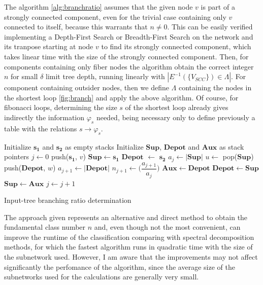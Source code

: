 \documentclass[12pt]{diazessay} %
\begin{document}
The algorithm \ref{alg:branchratio} assumes that the given node $v$ is part of a strongly connected component, even for the trivial case containing only $v$ connected to itself, because this warrants that $n \neq 0$. This can be easily verified implementing a Depth-First Search or Breadth-First Search on the network and its tranpose starting at node $v$ to find its strongly connected component, which takes linear time with the size of the strongly connected component. Then, for components containing only fiber nodes the algorithm obtain the correct integer $n$ for small $\delta$ limit tree depth, running linearly with $|E^{-1}(\{V_{SCC}\}) \in \Lambda|$. For component containing outsider nodes, then we define $\Lambda$ containing the nodes in the shortest loop \ref{fig:branch} and apply the above algorithm. Of course, for fibonacci loops, determining the size $s$ of the shortest loop already gives indirectly the information $\varphi_s$ needed, being necessary only to define previously a table with the relations $s \rightarrow \varphi_s$.

\begin{algorithm}[!h]
	\SetAlgoLined
    Initialize $\mathbf{s_1}$ and $\mathbf{s_2}$ as empty stacks\;
	Initialize $\mathbf{Sup}$, $\mathbf{Depot}$ and $\mathbf{Aux}$ as stack pointers\;
	$j \leftarrow 0$\;
	push($\mathbf{s_1}$, $v$)\;
	$\mathbf{Sup} \leftarrow \mathbf{s_1}$\;
	$\mathbf{Depot}$ $\leftarrow$ $\mathbf{s_2}$\;
	{
		$a_j \leftarrow |\mathbf{Sup}|$\;
		{
			$u \leftarrow $ pop($\mathbf{Sup}$)\;
			{
				push($\mathbf{Depot}$, $w$)\;
			}
		}
		$a_{j+1} \leftarrow |\mathbf{Depot}|$\;
		$n_{j+1} \leftarrow \bigg(\dfrac{a_{j+1}}{a_j}\bigg)$\;
		$\mathbf{Aux} \leftarrow \mathbf{Depot}$\;
		$\mathbf{Depot} \leftarrow \mathbf{Sup}$\;
		$\mathbf{Sup} \leftarrow \mathbf{Aux}$\;
		$j \leftarrow j + 1$\;
	}
	\caption{Input-tree branching ratio determination}
	\label{alg:branchratio}
\end{algorithm}

The approach given represents an alternative and direct method to obtain the fundamental class number $n$ and, even though not the most convenient, can improve the runtime of the classification comparing with spectral decomposition methods, for which the fastest algorithm runs in quadratic time with the size of the subnetwork used. However, I am aware that the improvements may not affect significantly the perfomance of the algorithm, since the average size of the subnetworks used for the calculations are generally very small.
\end{document}
